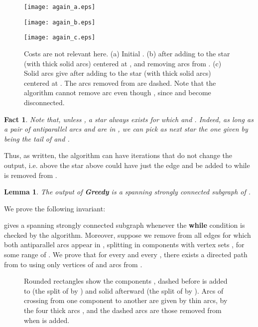 \documentclass[12pt]{article}
\def\proof{\noindent {\bf Proof. \ }}
\newtheorem{lemma}[proposition]{Lemma}
\newtheorem{fact}[proposition]{Fact}
\begin{document}
\begin{figure}[ht]
\begin{minipage}[b]{0.3\linewidth}
\centering
\texttt{[image: again\_a.eps]}
\end{minipage}
\begin{minipage}[b]{0.3\linewidth}
\centering
\texttt{[image: again\_b.eps]}
\end{minipage}
\begin{minipage}[b]{0.3\linewidth}
\centering
\texttt{[image: again\_c.eps]}
\end{minipage}
\caption{
Costs are not relevant here.  (a) Initial .  
(b)  after adding to 
 the star  (with thick solid arcs) centered at ,
and removing arcs from .
(c) Solid arcs give 
 after adding 
to  the star  (with thick solid arcs) centered at .
The arcs removed from  are dashed.
Note that the algorithm cannot remove arc  even though
, since  and  become disconnected.
}\label{f_again}
\end{figure}

\begin{fact}
\label{obs}
Note that, unless , a star  always exists for which 
 and .
Indeed, as long as a pair of antiparallel arcs  and  are
in , 
we can pick as next star  the one
given by  being the tail of  and .
\end{fact}

Thus, as written, the algorithm can have iterations that do not change
the output, i.e. above the star  above could
have just the edge  and
be added to  while  is removed from . 

\begin{lemma}
The output of {\bf Greedy} is a spanning strongly connected subgraph of .
\label{l_output_good}
\end{lemma}
\proof
We prove the following invariant:

gives a spanning strongly connected subgraph whenever the {\bf while}
condition is checked by the algorithm. Moreover,
suppose we remove from  all edges for which both
antiparallel arcs appear in , splitting  in components
with vertex sets , for some range of .
We prove that
for every  and every , there exists a
directed  path  from  to   using only vertices of 
and arcs from .

\begin{figure}[bht]
\begin{center}\leavevmode {}
\end{center}
\caption{
Rounded rectangles show the components , dashed before 
is added to  (the split of  by ) and solid afterward 
(the split of  by ).
Arcs of  crossing from one component to another are given by thin arcs,
 by the four thick arcs ,
and the dashed arcs are those removed from  when  is added.
}\label{f_invariant}
\end{figure}
\end{document}
